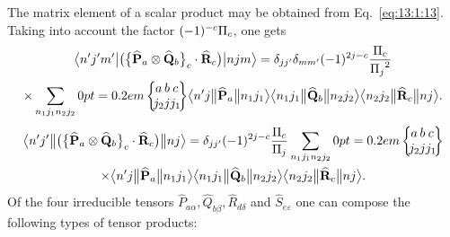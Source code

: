 The matrix element of a scalar product may be obtained from Eq.~\eqref{eq:13:1:13}. Taking into account the factor \((-1)^{-c} \Fact{c}\), one gets
\begin{multline}
\braOket{n^{\prime} j^{\prime} m^{\prime}}{\bigl(\bigl\{\widehat{\vect{P}}_{a} \otimes \widehat{\vect{Q}}_{b}\bigr\}_{c} \cdot \widehat{\vect{R}}_{c}\bigr)}{n j m}=\delta_{j j^{\prime}} \delta_{m m^{\prime}}(-1)^{2 j-c} \frac{\Fact{c}}{\Fact{j}^{2}} \\
\times \sum_{n_{1} j_{1} n_{2} j_{2}}
\sixj{a}{b}{c}{j_{2}}{j}{j_{1}}
\braOketred{ n^{\prime} j}{\widehat{\vect{P}}_{a}}{ n_{1} j_{1}}
\braOketred{ n_{1} j_{1}}{\widehat{\vect{Q}}_{b}}{ n_{2} j_{2}}
\braOketred{ n_{2} j_{2}}{\widehat{\vect{R}}_{c}}{ n j} . \label{eq:13:1:14}
\end{multline}
\begin{multline*}
\braOketred{n^{\prime} j^{\prime}}{\bigl(\bigl\{\widehat{\vect{P}}_{a} \otimes \widehat{\vect{Q}}_{b}\bigr\}_{c} \cdot \widehat{\vect{R}}_{c}\bigr)}{n j}=\delta_{j j^{\prime}}(-1)^{2 j-c} \frac{\Fact{c}}{\Fact{j}}
\sum_{n_{1} j_{1} n_{2} j_{2}}
\sixj{a}{b}{c}{j_{2}}{j}{j_{1}} \\
\times
\braOketred{ n^{\prime} j}{\widehat{\vect{P}}_{a}}{ n_{1} j_{1}}
\braOketred{ n_{1} j_{1}}{\widehat{\vect{Q}}_{b}}{ n_{2} j_{2}}
\braOketred{ n_{2} j_{2}}{\widehat{\vect{R}}_{c}}{ n j} .
\end{multline*}
Of the four irreducible tensors \(\widehat{P}_{a \alpha}, \widehat{Q}_{b \beta}, \widehat{R}_{d \delta}\) and \(\widehat{S}_{e \varepsilon}\) one can compose the following types of tensor products:
